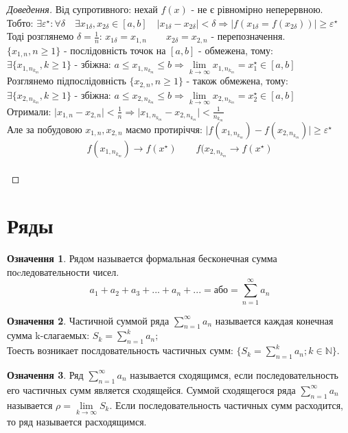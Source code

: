 \documentclass[14pt,a4paper]{scrartcl}
\theoremstyle{definition}
\newtheorem{defo}{Означення}[section]
\theoremstyle{remark}
\theoremstyle{definition}
\theoremstyle{definition}
\begin{document}
\begin{proof}[Доведення]
  Від супротивного: нехай $f(x)$ - не є рівномірно неперервною. \\
  Тобто: $\exists  \varepsilon^\star : \forall \delta \quad  \exists x_{1\delta}, x_{2\delta} \in [a,b] \quad \vert x_{1\delta} - x_{2\delta} \vert < \delta \Rightarrow \vert f(x_{1\delta} = f(x_{2\delta})) \vert \geq  \varepsilon ^\star  $\\
  Тоді розглянемо $\delta = \frac{1}{n} $: \quad
  $x_{1\delta} = x_{1,n} \qquad x_{2\delta} = x_{2,n} $ - перепозначення.\\
  $\lbrace x_{1,n}, n\geq 1 \rbrace$ - послідовність точок на $[a,b]$ - обмежена, тому: \\ $\exists \lbrace x_{1,n_{k_m}}, k\geq 1 \rbrace $ - збіжна: $a \leq x_{1,n_{k_m}} \leq b \Rightarrow  \lim\limits_{k\to  \infty}{x_{1,n_{k_m}}} =  x^{\star}_1 \in [a,b]$\\
  Розглянемо підпослідовність $\lbrace x_{2,n}, n\geq 1 \rbrace$ - також обмежена, тому:\\ $\exists \lbrace x_{2,n_{k_m}}, k\geq 1 \rbrace $ - збіжна:
  $a \leq x_{2,n_{k_m}} \leq b \Rightarrow  \lim\limits_{k\to  \infty}{x_{2,n_{k_m}}} =  x^{\star}_2 \in [a,b]$\\
  Отримали: $\vert x_{1,n} - x_{2,n} \vert < \frac{1}{n} \Longrightarrow \vert x_{1,n_{k_m}} - x_{2,n_{k_m}} \vert < \frac{1}{n_{k_m}} $\\
  Але за побудовою $x_{1,n}, x_{2,n} $  маємо протиріччя: $\vert f(x_{1,n_{k_m}}) - f(x_{2,n_{k_m}}) \vert \geq \varepsilon^\star $\\
  $$f(x_{1,n_{k_m}}) \to f(x^\star) \qquad f(x_{2,n_{k_m}} \to f(x^\star)$$\\
\end{proof}
\pagebreak

\section{Ряды}
\begin{defo}
  Рядом называется формальная бесконечная сумма поcледовательности чисел.
  $$ a_1+ a_2+ a_3 + ... + a_n + ... = \text{або} =  \sum\limits_{n = 1}^{ \infty}{a_n}  $$

\end{defo}
\begin{defo}
  Частичной суммой ряда  $\sum\limits_{n = 1}^{ \infty}{a_n}$ называется каждая конечная сумма k-слагаемых:
  $ S_k =  \sum\limits_{n = 1}^{ k}{a_n}; $\\
  Тоесть возникает послдовательность частичных сумм: $\lbrace S_k =  \sum\limits_{n = 1}^{k}{a_n}; k \in \mathbb{N} \rbrace $.
\end{defo}
\begin{defo}
  Ряд $ \sum\limits_{n = 1}^{ \infty}{a_n} $ называется сходящимся, если последовательность его частичных сумм является сходящейся. Суммой сходящегося ряда $ \sum\limits_{n = 1}^{ \infty}{a_n} $ называется $\rho =  \lim\limits_{k\to  \infty}{S_k} $. Если последовательность частичных сумм расходится, то ряд называется расходящимся.
\end{defo}
\end{document}
